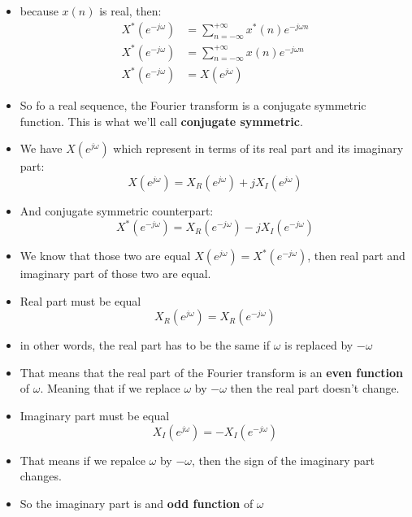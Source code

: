 \documentclass[pdflatex,compress,mathserif]{beamer}
\begin{document}
\begin{frame}
	\begin{itemize}
		\item[] because $ x(n) $ is real, then:
		\begin{align*}
		X^*(e^{-j\omega}) &= \sum_{n = -\infty}^{+\infty} x^*(n) e^{-j\omega n} \\
		X^*(e^{-j\omega}) &= \sum_{n = -\infty}^{+\infty} x(n) e^{-j\omega n} \\
		X^*(e^{-j\omega}) &= X(e^{j\omega})
		\end{align*}
		\item So fo a real sequence, the Fourier transform is a conjugate symmetric function. This is what we'll call \textbf{conjugate symmetric}.
	\end{itemize}
\end{frame}

\begin{frame}
	\begin{itemize}
		\item We have $ X(e^{j\omega}) $ which represent in terms of its real part and its imaginary part:
		\[ X(e^{j\omega}) = X_R(e^{j \omega}) + j X_I(e^{j \omega}) \]
		\item And conjugate symmetric counterpart:
		\[ X^*(e^{-j\omega}) = X_R(e^{-j \omega}) - j X_I(e^{-j \omega}) \]
		\item We know that those two are equal $ X(e^{j\omega}) = X^*(e^{-j\omega}) $, then real part and imaginary part of those two are equal.
	\end{itemize}
\end{frame}

\begin{frame}
	\begin{itemize}
		\item Real part must be equal
		\[ X_R(e^{j \omega}) = X_R(e^{-j \omega}) \]
		\item in other words, the real part has to be the same if $\omega$ is replaced by $-\omega$
		\item That means that the real part of the Fourier transform is an \textbf{even function} of $\omega$. Meaning that if we replace $\omega$ by $-\omega$ then the real part doesn't change.
	\end{itemize}
\end{frame}

\begin{frame}
	\begin{itemize}
		\item Imaginary part must be equal
		\[ X_I(e^{j \omega}) = -X_I(e^{-j \omega}) \]
		\item That means if we repalce $\omega$ by $-\omega$, then the sign of the imaginary part changes.
		\item So the imaginary part is and \textbf{odd function} of $\omega$
	\end{itemize}
\end{frame}
\end{document}
